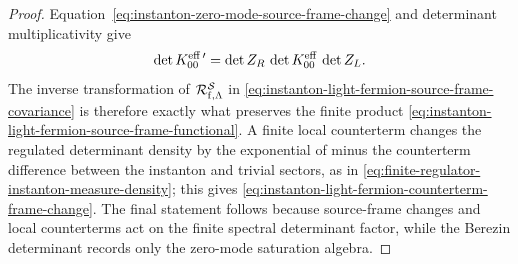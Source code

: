 \begin{proof}
Equation~\eqref{eq:instanton-zero-mode-source-frame-change} and determinant
multiplicativity give
\[
  \det K_{00}^{\rm eff\,\prime}
  =
  \det Z_R\,\det K_{00}^{\rm eff}\,\det Z_L .
\]
The inverse transformation of
\(\mathcal R_{{\rm f},\Lambda}^{\mathcal S}\) in
\eqref{eq:instanton-light-fermion-source-frame-covariance} is therefore exactly
what preserves the finite product
\eqref{eq:instanton-light-fermion-source-frame-functional}.  A finite local
counterterm changes the regulated determinant density by the exponential of
minus the counterterm difference between the instanton and trivial sectors, as
in \eqref{eq:finite-regulator-instanton-measure-density}; this gives
\eqref{eq:instanton-light-fermion-counterterm-frame-change}.  The final
statement follows because source-frame changes and local counterterms act on
the finite spectral determinant factor, while the Berezin determinant records
only the zero-mode saturation algebra.
\end{proof}

